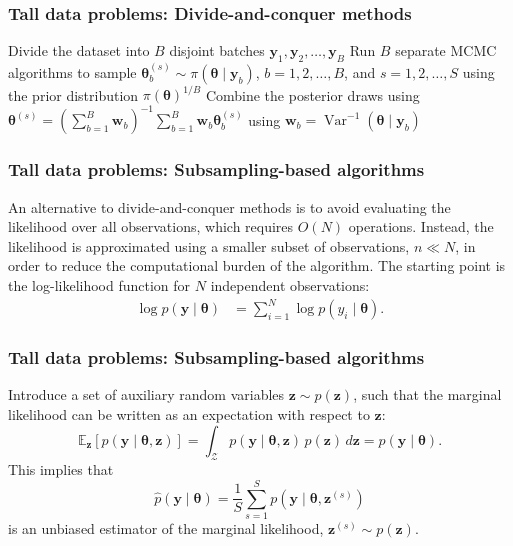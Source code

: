 \documentclass[12pt, compress]{beamer}
\begin{document}
\begin{frame}
	\frametitle{Tall data problems: Divide-and-conquer methods}
\begin{algorithm}[H]
	\caption{Consensus Monte Carlo algorithm}
    \label{Alg:CMC}
	\begin{algorithmic}[1]
		\State Divide the dataset into \( B \) disjoint batches $\mathbf{y}_1, \mathbf{y}_2, \dots, \mathbf{y}_B$
		\State Run $B$ separate MCMC algorithms to sample $\boldsymbol{\theta}_b^{(s)}\sim \pi(\boldsymbol{\theta}\mid \mathbf{y}_b)$, $b=1,2,\dots,B$, and $s=1,2,\dots,S$ using the prior distribution $\pi(\boldsymbol{\theta})^{1/B}$
		\State Combine the posterior draws using $\boldsymbol{\theta}^{(s)}=\left(\sum_{b=1}^B\mathbf{w}_b\right)^{-1} \sum_{b=1}^B\mathbf{w}_b \boldsymbol{\theta}^{(s)}_b$ using \( \mathbf{w}_b = \operatorname{Var}^{-1}(\boldsymbol{\theta} \mid \mathbf{y}_b) \)    		 			 
	\end{algorithmic} 
\end{algorithm}
\end{frame}

\begin{frame}
	\frametitle{Tall data problems: Subsampling-based algorithms}
An alternative to divide-and-conquer methods is to avoid evaluating the likelihood over all observations, which requires \( O(N) \) operations. Instead, the likelihood is approximated using a smaller subset of observations, \( n \ll N \), in order to reduce the computational burden of the algorithm. The starting point is the log-likelihood function for \( N \) independent observations:
\begin{align*}
	\log p(\mathbf{y} \mid \boldsymbol{\theta}) &= \sum_{i=1}^N \log p(y_i \mid \boldsymbol{\theta}).
\end{align*}
\end{frame}

\begin{frame}
	\frametitle{Tall data problems: Subsampling-based algorithms}
Introduce a set of auxiliary random variables \( \mathbf{z} \sim p(\mathbf{z}) \), such that the marginal likelihood can be written as an expectation with respect to \( \mathbf{z} \):
\[
\mathbb{E}_{\mathbf{z}}[p(\mathbf{y} \mid \boldsymbol{\theta}, \mathbf{z})] = \int_{\mathcal{Z}} p(\mathbf{y} \mid \boldsymbol{\theta}, \mathbf{z}) \, p(\mathbf{z}) \, d\mathbf{z} = p(\mathbf{y} \mid \boldsymbol{\theta}).
\]
This implies that
\[
\hat{p}(\mathbf{y} \mid \boldsymbol{\theta}) = \frac{1}{S} \sum_{s=1}^S p(\mathbf{y} \mid \boldsymbol{\theta}, \mathbf{z}^{(s)})
\]
is an unbiased estimator of the marginal likelihood, \( \mathbf{z}^{(s)} \sim p(\mathbf{z}) \).
\end{frame}
\end{document}
